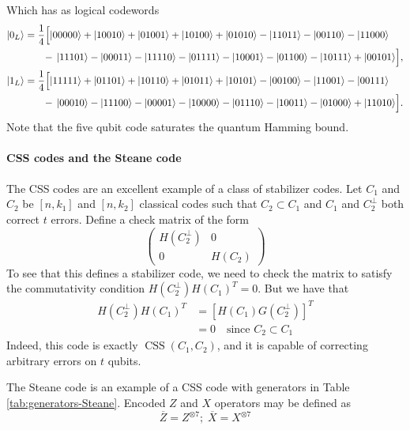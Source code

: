 \documentclass[11pt,a4paper]{article}
\theoremstyle{definition}
\theoremstyle{plain}
\theoremstyle{remark}
\begin{document}
Which has as logical codewords 
\begin{align}
\lvert0_L\rangle &= \frac{1}{4}\Bigl[
   \lvert00000\rangle + \lvert10010\rangle + \lvert01001\rangle + \lvert10100\rangle
   + \lvert01010\rangle - \lvert11011\rangle - \lvert00110\rangle - \lvert11000\rangle\notag\\
 &\quad\;\;\;
   -\,\lvert11101\rangle - \lvert00011\rangle - \lvert11110\rangle - \lvert01111\rangle
   - \lvert10001\rangle - \lvert01100\rangle - \lvert10111\rangle + \lvert00101\rangle
\Bigr],\\
\lvert1_L\rangle &= \frac{1}{4}\Bigl[
   \lvert11111\rangle + \lvert01101\rangle + \lvert10110\rangle + \lvert01011\rangle
   + \lvert10101\rangle - \lvert00100\rangle - \lvert11001\rangle - \lvert00111\rangle\notag\\
 &\quad\;\;\;
   -\,\lvert00010\rangle - \lvert11100\rangle - \lvert00001\rangle - \lvert10000\rangle
   - \lvert01110\rangle - \lvert10011\rangle - \lvert01000\rangle + \lvert11010\rangle
\Bigr].
\end{align}
Note that the five qubit code saturates the quantum Hamming bound. 

\paragraph{CSS codes and the Steane code} 
The CSS codes are an excellent example of a class of stabilizer codes. Let $C_1$ and $C_2$ be 
$[n,k_1]$ and $[n,k_2]$ classical codes such that $C_2 \subset C_1$ and $C_1$ and $C_2^\perp$ both 
correct $t$ errors. Define a check matrix of the form 
$$\begin{pmatrix}
  H(C_2^\perp) & 0 \\
  0 & H(C_2)
\end{pmatrix}$$
To see that this defines a stabilizer code, we need to check the matrix to satisfy the commutativity 
condition $H(C_2^\perp) H(C_1)^T = 0$. But we have that 
\begin{align}
  H(C_2^\perp) H(C_1)^T &= [H(C_1)G(C_2^\perp)]^T \\
  &= 0 \quad \text{since $C_2 \subset C_1$}
\end{align}
Indeed, this code is exactly $\operatorname{CSS}(C_1, C_2)$, and it is capable of correcting arbitrary errors on $t$ qubits. 

The Steane code is an example of a CSS code with generators in Table \ref{tab:generators-Steane}. Encoded $Z$ and $X$ operators 
may be defined as 
$$\overline{Z} = Z^{\otimes 7}; \; \overline{X} = X^{\otimes 7}$$
\end{document}
